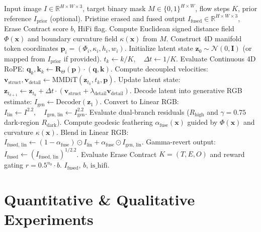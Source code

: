 \documentclass[11pt,a4paper]{article}
\begin{document}
\begin{algorithm}[t]
\caption{PrismErase Unified Inpainting \& Erase Pipeline}
\label{alg:prismerase}
\begin{algorithmic}[1]
\REQUIRE Input image $I \in \mathbb{R}^{H \times W \times 3}$, target binary mask $M \in \{0, 1\}^{H \times W}$, flow steps $K$, prior reference $I_{\text{prior}}$ (optional).
\ENSURE Pristine erased and fused output $I_{\text{fused}} \in \mathbb{R}^{H \times W \times 3}$, Erase Contract score $b$, HiFi flag.
\STATE Compute Euclidean signed distance field $\Phi(\mathbf{x})$ and boundary curvature field $\kappa(\mathbf{x})$ from $M$.
\STATE Construct 4D manifold token coordinates $\mathbf{p}_i = (\Phi_i, \kappa_i, h_i, w_i)$.
\STATE Initialize latent state $\mathbf{z}_0 \sim \mathcal{N}(0, \mathbf{I})$ (or mapped from $I_{\text{prior}}$ if provided).
    \STATE $t_k \leftarrow k / K, \quad \Delta t \leftarrow 1 / K$.
    \STATE Evaluate Continuous 4D RoPE: $\mathbf{q}_k, \mathbf{k}_k \leftarrow \mathbf{R}_{\Theta}(\mathbf{p}) \cdot (\mathbf{q}, \mathbf{k})$.
    \STATE Compute decoupled velocities: $\mathbf{v}_{\text{struct}}, \mathbf{v}_{\text{detail}} \leftarrow \text{MMDiT}(\mathbf{z}_{t_k}, t_k, \mathbf{p})$.
    \STATE Update latent state: $\mathbf{z}_{t_{k+1}} \leftarrow \mathbf{z}_{t_k} + \Delta t \cdot (\mathbf{v}_{\text{struct}} + \lambda_{\text{detail}} \mathbf{v}_{\text{detail}})$.
\ENDFOR
\STATE Decode latent into generative RGB estimate: $I_{\text{gen}} \leftarrow \text{Decoder}(\mathbf{z}_1)$.
\STATE Convert to Linear RGB: $I_{\text{lin}} \leftarrow I^{2.2}, \quad I_{\text{gen, lin}} \leftarrow I_{\text{gen}}^{2.2}$.
\STATE Evaluate dual-branch residuals ($R_{\text{high}}$ and $\gamma=0.75$ dark-region $R_{\text{dark}}$).
\STATE Compute geodesic feathering $\alpha_{\text{fuse}}(\mathbf{x})$ guided by $\Phi(\mathbf{x})$ and curvature $\kappa(\mathbf{x})$.
\STATE Blend in Linear RGB: $I_{\text{fused, lin}} \leftarrow (1 - \alpha_{\text{fuse}}) \odot I_{\text{lin}} + \alpha_{\text{fuse}} \odot I_{\text{gen, lin}}$.
\STATE Gamma-revert output: $I_{\text{fused}} \leftarrow (I_{\text{fused, lin}})^{1/2.2}$.
\STATE Evaluate Erase Contract $K = (T, E, O)$ and reward gating $r = 0.5^{n_0} \cdot b$.
\RETURN $I_{\text{fused}}$, $b$, $\text{is\_hifi}$.
\end{algorithmic}
\end{algorithm}

\section{Quantitative \& Qualitative Experiments}
\label{sec:experiments}
\end{document}
